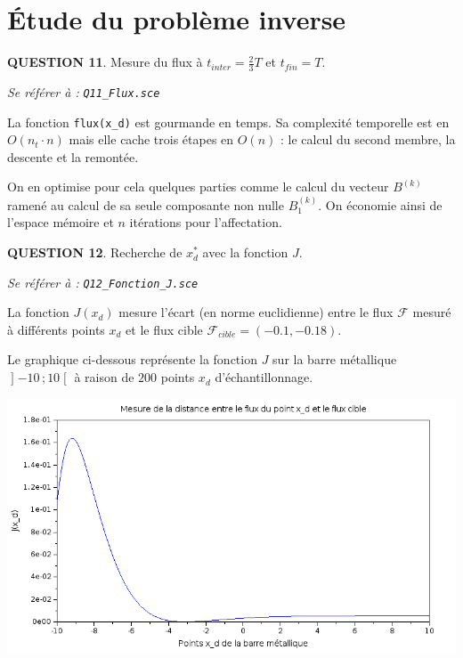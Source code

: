 \documentclass[a4paper,11pt]{article}
\newcommand{\quest}[1]{\small\textbf{#1}\normalsize}
\theoremstyle{nonumberplain}
\theoremstyle{nonumberplain}
\theoremstyle{nonumberplain}
\begin{document}
\medskip
\section{\'{E}tude du problème inverse}

    \quest{QUESTION 11}. Mesure du flux à $t_{inter} = \frac{2}{3} T$ et $t_{fin} = T$.
    \begin{ref_scilab}
        \emph{Se référer à :} \texttt{\emph{Q11\_Flux.sce}}
    \end{ref_scilab}

    La fonction \texttt{flux(x\_d)} est gourmande en temps.
    Sa complexité temporelle est en $O(n_t \cdot n)$ mais elle cache trois
    étapes en $O(n)$ : le calcul du second membre, la descente et la remontée.

    \medskip
    On en optimise pour cela quelques parties comme le calcul du vecteur $B^{(k)}$ ramené
    au calcul de sa seule composante non nulle $B_1^{(k)}$. On économie ainsi de l'espace mémoire
    et $n$ itérations pour l'affectation.

    \newpage\quest{QUESTION 12}. Recherche de $x_d^{*}$ avec la fonction $J$.
    \begin{ref_scilab}
        \emph{Se référer à :} \texttt{\emph{Q12\_Fonction\_J.sce}}
    \end{ref_scilab}

    La fonction $J(x_d)$ mesure l'écart (en norme euclidienne) entre le flux $\mathcal{F}$ mesuré
    à différents points $x_d$ et le flux cible $\mathcal{F}_{cible} = (-0.1, -0.18)$.

    \medskip
    Le graphique ci-dessous représente la fonction $J$ sur la barre
    métallique $\mathopen{]}-10\,;10\mathclose{[}$ à raison de $200$
    points $x_d$ d'échantillonnage.

    \begin{center}
        \includegraphics[scale=0.62]{images/q12_mesure_xd.png}
    \end{center}
\end{document}
